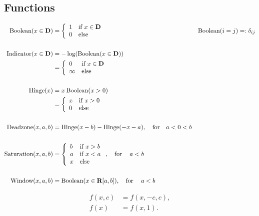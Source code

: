 \documentclass{article}
\begin{document}
\subsection{Functions}
    \begin{align*}
        \text{Boolean}(x\in\textbf{D})
        &=\left\{
            \begin{array}{lllllllllllllllllll}
            1&\text{if $x\in\textbf{D}$} \\ 
            0&\text{else}
            \end{array}\right.
            &&\text{Boolean}(i=j)=:\delta_{ij}
            \\\\
        \text{Indicator}(x\in\textbf{D})&=-\log(\text{Boolean}(x\in\textbf{D}))\\
        &=\left\{
            \begin{array}{lllllllllllllllllll}
            0&\text{if $x\in\textbf{D}$} \\ 
            \infty&\text{else}
            \end{array}\right.
            &&\text{}
        \\\\
        \text{Hinge}(x)&=x\:\text{Boolean}(x>0)\\
        &=
        \left\{
            \begin{array}{lllllllllllllllllll}
            x&\text{if $x>0$} \\ 
            0&\text{else}
            \end{array}\right.&&                
            \\\\
        \text{Deadzone}(x,a,b)&=\text{Hinge}(x-b)-\text{Hinge}(-x-a),\quad\text{for}\quad a<0<b
        &&\text{}
        \\\\
        \text{Saturation}(x,a,b)&=
        \left\{
            \begin{array}{lllllllllllllllllll}
                b&\text{if $x>b$} \\ 
        a&\text{if $x<a$} \\
        x & \text{else}\end{array}\right.,\quad\text{for}\quad\:a<b
        &&\text{}
        \\\\
        \text{Window}(x,a,b)&=
        \text{Boolean}(x\in\textbf{R}[a,b]),
                \quad\text{for}\quad\:a<b
        &&\text{}
    \end{align*} 


    \begin{align*}
        f(x,c)&=f(x,-c,c),\\
        f(x)&=f(x,1).
    \end{align*}
\end{document}
